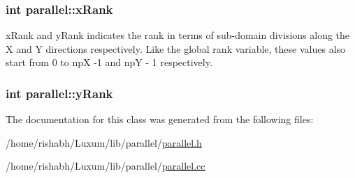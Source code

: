 \subsubsection[{\texorpdfstring{x\+Rank}{xRank}}]{\setlength{\rightskip}{0pt plus 5cm}int parallel\+::x\+Rank}\hypertarget{classparallel_a24418c6a2aa5edb7c06a024757cb2bb6}{}\label{classparallel_a24418c6a2aa5edb7c06a024757cb2bb6}
x\+Rank and y\+Rank indicates the rank in terms of sub-\/domain divisions along the X and Y directions respectively. Like the global rank variable, these values also start from 0 to npX -\/1 and npY -\/ 1 respectively. 
\subsubsection[{\texorpdfstring{y\+Rank}{yRank}}]{\setlength{\rightskip}{0pt plus 5cm}int parallel\+::y\+Rank}\hypertarget{classparallel_a79838566ac5a6e3013343b66e272d08d}{}\label{classparallel_a79838566ac5a6e3013343b66e272d08d}


The documentation for this class was generated from the following files\+:\begin{DoxyCompactItemize}
\item 
/home/rishabh/\+Luxum/lib/parallel/\hyperlink{parallel_8h}{parallel.\+h}\item 
/home/rishabh/\+Luxum/lib/parallel/\hyperlink{parallel_8cc}{parallel.\+cc}\end{DoxyCompactItemize}
